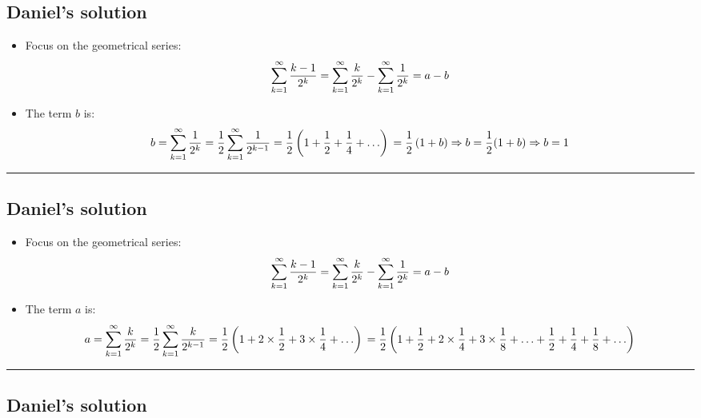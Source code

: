 \documentclass[
  letterpaper,
  DIV=11,
  numbers=noendperiod]{scrartcl}
\providecommand{\tightlist}{%
  \setlength{\itemsep}{0pt}\setlength{\parskip}{0pt}}\usepackage{longtable,booktabs,array}
\begin{document}
\subsection{Daniel's solution}\label{daniels-solution-1}

\begin{itemize}
\tightlist
\item
  Focus on the geometrical series: \[\small
    \sum_{k=1}^{\infty}\frac{k-1}{2^k} = \sum_{k=1}^{\infty}\frac{k}{2^k} - \sum_{k=1}^{\infty}\frac{1}{2^k} = a - b
  \]
\item
  The term \(b\) is: \[\small
    b = \sum_{k=1}^{\infty}\frac{1}{2^k} = \frac{1}{2}\sum_{k=1}^{\infty}\frac{1}{2^{k-1}} = \frac{1}{2}\left(1 + \frac{1}{2} + \frac{1}{4} + \ldots \right) \\
    = \frac{1}{2}\left(1 + b\right) \Rightarrow b = \frac{1}{2}(1+b) \Rightarrow b = 1
  \]
\end{itemize}

\begin{center}\rule{0.5\linewidth}{0.5pt}\end{center}

\subsection{Daniel's solution}\label{daniels-solution-2}

\begin{itemize}
\tightlist
\item
  Focus on the geometrical series: \[\small
    \sum_{k=1}^{\infty}\frac{k-1}{2^k} = \sum_{k=1}^{\infty}\frac{k}{2^k} - \sum_{k=1}^{\infty}\frac{1}{2^k} = a - b
  \]
\item
  The term \(a\) is: \[\small
    a = \sum_{k=1}^{\infty}\frac{k}{2^k} = \frac{1}{2}\sum_{k=1}^{\infty}\frac{k}{2^{k-1}} = 
    \frac{1}{2}\left(1 + 2\times \frac{1}{2} + 3 \times \frac{1}{4} + \ldots \right) \\
    = \frac{1}{2}\left(1 + \frac{1}{2} + 2\times\frac{1}{4} + 3\times \frac{1}{8} + \ldots + \frac{1}{2} + \frac{1}{4} + \frac{1}{8} + \ldots\right) 
  \]
\end{itemize}

\begin{center}\rule{0.5\linewidth}{0.5pt}\end{center}

\subsection{Daniel's solution}\label{daniels-solution-3}
\end{document}

